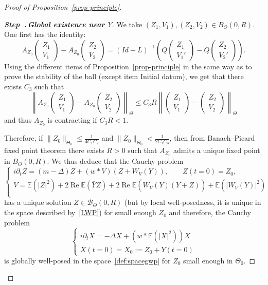 \documentclass[10pt]{amsart}
\theoremstyle{definition}\newtheorem{defi}[theo]{Definition}\newtheorem{rema}[theo]{Remark}\newtheorem{exam}[theo]{Example}\newtheorem{exem}[theo]{Example}\newtheorem{nota}[theo]{Notation}
\newcommand{\E}{\mathbb{E}}
\DeclareMathOperator{\Rel}{Re}
\newcommand{\mclB}{\mathcal{B}}
\newcounter{stepcount}
\newenvironment{step}[1]{\refstepcounter{stepcount}\begin{proof}[{\bf{Step~\thestepcount}{.\,\emph{#1}}}]}{\let\qed\relax\end{proof}}
\begin{document}
\begin{proof}[Proof of Proposition~\ref{prop-principle}]
\begin{step}{{Global existence near $Y$}}
We take $(Z_1,V_1),(Z_2,V_2)\in B_\Theta(0,R)$. One first has the identity:
\begin{equation} \label{id:AV1-V2inter}
A_{Z_0}
\begin{pmatrix}
Z_1\\ V_1
\end{pmatrix} - A_{Z_0}
\begin{pmatrix}
Z_2\\ V_2
\end{pmatrix} = (Id-L)^{-1} \left(Q
\begin{pmatrix}
Z_1\\ V_1'
\end{pmatrix} - Q
\begin{pmatrix}
Z_2\\ V_2'
\end{pmatrix} \right).
\end{equation} Using the different items of Proposition~\ref{prop-principle} in the same way as to prove the stability of the ball (except item Initial datum), we get that there exists $C_3$ such that
\[
\left \| A_{Z_0}
\begin{pmatrix} Z_1\\V_1
\end{pmatrix} - A_{Z_0}
\begin{pmatrix} Z_2\\V_2
\end{pmatrix} \right\|_{\Theta} \leq C_{3} R \left\|
\begin{pmatrix} Z_1\\V_1
\end{pmatrix} -
\begin{pmatrix} Z_2\\V_2
\end{pmatrix} \right\|_{\Theta}
\]
and thus $A_{Z_0}$ is contracting if $C_{3}R <1$.
\vspace{4pt}


Therefore, if $\|Z_0\|_{\Theta_0} \leq \frac1{4C_1C_2} $ and $\|Z_0\|_{\Theta_0} < \frac1{2C_1C_{3}}$, then from Banach--Picard fixed point theorem there exists $R>0$ such that $A_{Z_0}$ admits a unique fixed point in $B_{\Theta}(0,R)$. We thus deduce that the Cauchy problem
\[
\begin{cases}
i\partial_t Z = (m-\Delta) Z + (w*V) (Z+W_V(Y)),\quad \quad Z (t=0) = Z_0, \\
V = \E\left(|Z|^2\right) + 2\Rel\E (\bar Y Z) + 2\Rel\E \left(\overline{ W_V(Y)}(Y+ Z)\right) + \E\left(|W_V(Y)|^2\right)\\
\end{cases}
\]
has a unique solution $Z \in \mclB_{\Theta}(0,R)$ (but by local well-posedness, it is unique in the space described by~\eqref{LWP}) for small enough $Z_0$ and therefore, the Cauchy problem
\[
\begin{cases}
i\partial_t X = -\Delta X + \left(w*\E\left(|X|^2\right)\right)X \\
X(t=0) = X_0 := Z_0 + Y(t=0)
\end{cases}
\]
is globally well-posed in the space~\eqref{def:spacegwp} for $Z_0$ small enough in $\Theta_0$.
\end{step}


\end{proof}
\end{document}
